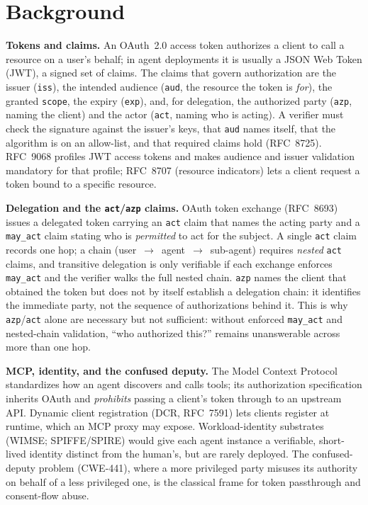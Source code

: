 \section{Background}\label{sec:background}
\noindent\textbf{Tokens and claims.} An OAuth~2.0 access token authorizes a client to
call a resource on a user's behalf; in agent deployments it is usually a JSON Web
Token (JWT), a signed set of claims. The claims that govern authorization are the
issuer (\texttt{iss}), the intended audience (\texttt{aud}, the resource the token is
\emph{for}), the granted \texttt{scope}, the expiry (\texttt{exp}), and, for
delegation, the authorized party (\texttt{azp}, naming the client) and the actor
(\texttt{act}, naming who is acting). A verifier must check the signature against the
issuer's keys, that \texttt{aud} names itself, that the algorithm is on an
allow-list, and that required claims hold (RFC~8725). RFC~9068 profiles JWT access
tokens and makes audience and issuer validation mandatory for that profile; RFC~8707
(resource indicators) lets a client request a token bound to a specific resource.

\noindent\textbf{Delegation and the \texttt{act}/\texttt{azp} claims.} OAuth token
exchange (RFC~8693) issues a delegated token carrying an \texttt{act} claim that
names the acting party and a \texttt{may\_act} claim stating who is \emph{permitted}
to act for the subject. A single \texttt{act} claim records one hop; a chain
(user~$\rightarrow$~agent~$\rightarrow$~sub-agent) requires \emph{nested}
\texttt{act} claims, and transitive delegation is only verifiable if each exchange
enforces \texttt{may\_act} and the verifier walks the full nested chain. \texttt{azp}
names the client that obtained the token but does not by itself establish a
delegation chain: it identifies the immediate party, not the sequence of
authorizations behind it. This is why \texttt{azp}/\texttt{act} alone are necessary
but not sufficient: without enforced \texttt{may\_act} and nested-chain validation,
``who authorized this?'' remains unanswerable across more than one hop.

\noindent\textbf{MCP, identity, and the confused deputy.} The Model Context Protocol
standardizes how an agent discovers and calls tools; its authorization specification
inherits OAuth and \emph{prohibits} passing a client's token through to an upstream
API. Dynamic client registration (DCR, RFC~7591) lets clients register at runtime,
which an MCP proxy may expose. Workload-identity substrates (WIMSE; SPIFFE/SPIRE)
would give each agent instance a verifiable, short-lived identity distinct from the
human's, but are rarely deployed. The confused-deputy problem (CWE-441), where a more
privileged party misuses its authority on behalf of a less privileged one, is the
classical frame for token passthrough and consent-flow abuse.

